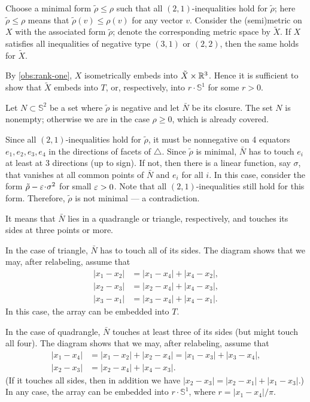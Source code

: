 \documentclass[a4paper,10pt]{article}
\begin{document}
Choose a minimal form $\tilde\rho\le \rho$ such that all $(2,1)$-inequalities hold for $\tilde\rho$;
here $\tilde\rho\le \rho$ means that $\tilde\rho(v)\le \rho(v)$ for any vector $v$.
Consider the (semi)metric on $X$ with the associated form $\tilde\rho$;
denote the corresponding metric space by $\tilde X$.
If $X$ satisfies all inequalities of negative type $(3, 1)$ or $(2,2)$, then the same holds for $\tilde X$.

By \ref{obs:rank-one}, $X$ isometrically embeds into $\tilde X\times \mathbb{R}^3$.
Hence it is sufficient to show that $\tilde X$ embeds into $T$, or, respectively, into $r\cdot \mathbb{S}^1$ for some $r>0$.

Let $N\subset \mathbb{S}^2$ be a set where $\tilde\rho$ is negative and let $\bar N$ be its closure.
The set $N$ is nonempty; otherwise we are in the case $\rho\ge 0$, which is already covered.

Since all $(2,1)$-inequalities hold for $\tilde\rho$,
it must be nonnegative on 4 equators $e_1,e_2,e_3,e_4$ in the directions of facets of $\triangle$.
Since $\tilde\rho$ is minimal, $\bar N$ has to touch $e_i$ at least at 3 directions (up to sign). 
If not, then there is a linear function, say $\sigma$, that vanishes at all common points of $\bar N$ and $e_i$ for all $i$.
In this case, consider the form $\tilde\rho-\eps\cdot \sigma^2$ for small $\varepsilon>0$.
Note that all $(2,1)$-inequalities still hold for this form.
Therefore, $\tilde\rho$ is not minimal --- a contradiction.

It means that $\bar N$ lies in a quadrangle or triangle, respectively, and touches its sides at three points or more.

In the case of triangle, $\bar N$ has to touch all of its sides.
The diagram shows that we may, after relabeling, assume that
\begin{align*}
|x_1-x_2|&=|x_1-x_4|+|x_4-x_2|,
\\
|x_2-x_3|&=|x_2-x_4|+|x_4-x_3|,
\\
|x_3-x_1|&=|x_3-x_4|+|x_4-x_1|.
\end{align*}
In this case, the array can be embedded into $T$.

In the case of quadrangle, $\bar N$ touches at least three of its sides (but might touch all four).
The diagram shows that we may, after relabeling, assume that
\begin{align*}
|x_1-x_4|&=|x_1-x_2|+|x_2-x_4|=|x_1-x_3|+|x_3-x_4|,
\\
|x_2-x_3|&=|x_2-x_4|+|x_4-x_3|.
\end{align*}
(If it touches all sides, then in addition we have $|x_2-x_3|=|x_2-x_1|+|x_1-x_3|$.)
In any case, the array can be embedded into $r\cdot \mathbb{S}^1$, where $r=|x_1-x_4|/\pi$.
\qeds
\end{document}
